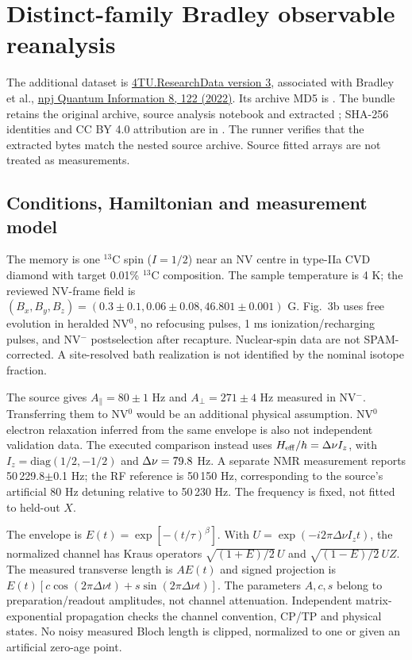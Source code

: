 \section{Distinct-family Bradley observable reanalysis}
\label{sec:bradleysupplement}
The additional dataset is \href{https://doi.org/10.4121/16887658.v3}{4TU.ResearchData version 3}, associated with Bradley et al., \href{https://doi.org/10.1038/s41534-022-00637-w}{npj Quantum Information 8, 122 (2022)}. Its archive MD5 is . The bundle retains the original archive, source analysis notebook and extracted ; SHA-256 identities and CC BY 4.0 attribution are in . The runner verifies that the extracted bytes match the nested source archive. Source fitted arrays are not treated as measurements.

\subsection{Conditions, Hamiltonian and measurement model}
The memory is one $^{13}$C spin ($I=1/2$) near an NV centre in type-IIa CVD diamond with target 0.01\% $^{13}$C composition. The sample temperature is 4 K; the reviewed NV-frame field is $(B_x,B_y,B_z)=(0.3\pm0.1,0.06\pm0.08,46.801\pm0.001)$ G. Fig.~3b uses free evolution in heralded NV$^0$, no refocusing pulses, 1 ms ionization/recharging pulses, and NV$^-$ postselection after recapture. Nuclear-spin data are not SPAM-corrected. A site-resolved bath realization is not identified by the nominal isotope fraction.

The source gives $A_\parallel=80\pm1$ Hz and $A_\perp=271\pm4$ Hz measured in NV$^-$. Transferring them to NV$^0$ would be an additional physical assumption. NV$^0$ electron relaxation inferred from the same envelope is also not independent validation data. The executed comparison instead uses $H_{\rm eff}/h=\Delta\nu I_z$, with $I_z=\mathrm{diag}(1/2,-1/2)$ and $\Delta\nu=79.8{}$ Hz. A separate NMR measurement reports 50\,229.8$\pm$0.1 Hz; the RF reference is 50\,150 Hz, corresponding to the source's artificial 80 Hz detuning relative to 50\,230 Hz. The frequency is fixed, not fitted to held-out $X$.

The envelope is $E(t)=\exp[-(t/\tau)^\beta]$. With $U=\exp(-i2\pi\Delta\nu I_zt)$, the normalized channel has Kraus operators $\sqrt{(1+E)/2}\,U$ and $\sqrt{(1-E)/2}\,UZ$. The measured transverse length is $AE(t)$ and signed projection is $E(t)[c\cos(2\pi\Delta\nu t)+s\sin(2\pi\Delta\nu t)]$. The parameters $A,c,s$ belong to preparation/readout amplitudes, not channel attenuation. Independent matrix-exponential propagation checks the channel convention, CP/TP and physical states. No noisy measured Bloch length is clipped, normalized to one or given an artificial zero-age point.

